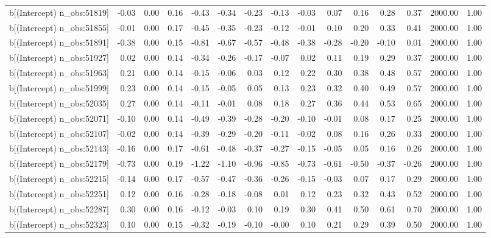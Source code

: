 \begin{table}[ht]
\begin{tabular}{rrrrrrrrrrrrrrr}
  b[(Intercept) n\_obs:51819] & -0.03 & 0.00 & 0.16 & -0.43 & -0.34 & -0.23 & -0.13 & -0.03 & 0.07 & 0.16 & 0.28 & 0.37 & 2000.00 & 1.00 \\ 
  b[(Intercept) n\_obs:51855] & -0.01 & 0.00 & 0.17 & -0.45 & -0.35 & -0.23 & -0.12 & -0.01 & 0.10 & 0.20 & 0.33 & 0.41 & 2000.00 & 1.00 \\ 
  b[(Intercept) n\_obs:51891] & -0.38 & 0.00 & 0.15 & -0.81 & -0.67 & -0.57 & -0.48 & -0.38 & -0.28 & -0.20 & -0.10 & 0.01 & 2000.00 & 1.00 \\ 
  b[(Intercept) n\_obs:51927] & 0.02 & 0.00 & 0.14 & -0.34 & -0.26 & -0.17 & -0.07 & 0.02 & 0.11 & 0.19 & 0.29 & 0.37 & 2000.00 & 1.00 \\ 
  b[(Intercept) n\_obs:51963] & 0.21 & 0.00 & 0.14 & -0.15 & -0.06 & 0.03 & 0.12 & 0.22 & 0.30 & 0.38 & 0.48 & 0.57 & 2000.00 & 1.00 \\ 
  b[(Intercept) n\_obs:51999] & 0.23 & 0.00 & 0.14 & -0.15 & -0.05 & 0.05 & 0.13 & 0.23 & 0.32 & 0.40 & 0.49 & 0.57 & 2000.00 & 1.00 \\ 
  b[(Intercept) n\_obs:52035] & 0.27 & 0.00 & 0.14 & -0.11 & -0.01 & 0.08 & 0.18 & 0.27 & 0.36 & 0.44 & 0.53 & 0.65 & 2000.00 & 1.00 \\ 
  b[(Intercept) n\_obs:52071] & -0.10 & 0.00 & 0.14 & -0.49 & -0.39 & -0.28 & -0.20 & -0.10 & -0.01 & 0.08 & 0.17 & 0.25 & 2000.00 & 1.00 \\ 
  b[(Intercept) n\_obs:52107] & -0.02 & 0.00 & 0.14 & -0.39 & -0.29 & -0.20 & -0.11 & -0.02 & 0.08 & 0.16 & 0.26 & 0.33 & 2000.00 & 1.00 \\ 
  b[(Intercept) n\_obs:52143] & -0.16 & 0.00 & 0.17 & -0.61 & -0.48 & -0.37 & -0.27 & -0.15 & -0.05 & 0.05 & 0.16 & 0.26 & 2000.00 & 1.00 \\ 
  b[(Intercept) n\_obs:52179] & -0.73 & 0.00 & 0.19 & -1.22 & -1.10 & -0.96 & -0.85 & -0.73 & -0.61 & -0.50 & -0.37 & -0.26 & 2000.00 & 1.00 \\ 
  b[(Intercept) n\_obs:52215] & -0.14 & 0.00 & 0.17 & -0.57 & -0.47 & -0.36 & -0.26 & -0.15 & -0.03 & 0.07 & 0.17 & 0.29 & 2000.00 & 1.00 \\ 
  b[(Intercept) n\_obs:52251] & 0.12 & 0.00 & 0.16 & -0.28 & -0.18 & -0.08 & 0.01 & 0.12 & 0.23 & 0.32 & 0.43 & 0.52 & 2000.00 & 1.00 \\ 
  b[(Intercept) n\_obs:52287] & 0.30 & 0.00 & 0.16 & -0.12 & -0.03 & 0.10 & 0.19 & 0.30 & 0.41 & 0.50 & 0.61 & 0.70 & 2000.00 & 1.00 \\ 
  b[(Intercept) n\_obs:52323] & 0.10 & 0.00 & 0.15 & -0.32 & -0.19 & -0.10 & -0.00 & 0.10 & 0.21 & 0.29 & 0.39 & 0.50 & 2000.00 & 1.00 \\ 

\end{tabular}
\end{table}
